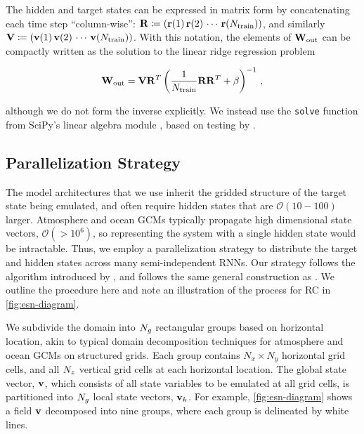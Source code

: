 The hidden and target states can be expressed in matrix form by concatenating
each time step ``column-wise'':
$\mathbf{R} \coloneqq (\mathbf{r}(1) \, \mathbf{r}(2) \, \cdots \, \mathbf{r}(N_\text{train}))$,
and similarly\\
\noindent$\mathbf{V} \coloneqq (\mathbf{v}(1) \, \mathbf{v}(2) \, \cdots \, \mathbf{v}(N_\text{train}))$.
With this notation, the elements of $\mathbf{W}_\text{out}$ can be compactly written as the
solution to the linear ridge regression problem
\begin{linenomath*}\begin{equation}
    \mathbf{W}_\text{out} = \mathbf{V} \mathbf{R}^T \left(\dfrac{1}{N_\text{train}}\mathbf{R}\mathbf{R}^T + \beta\right)^{-1} \, ,
    \label{eq:ridge_regression}
\end{equation}\end{linenomath*}
although we do not form the inverse explicitly.
We instead use the \texttt{solve} function from SciPy's linear algebra module
\citep{scipy_2020}, based on testing by
\citet{platt_systematic_2022}.


\subsection{Parallelization Strategy}
\label{subsec:parallelization}

The model architectures that we use inherit the gridded structure of the target
state being emulated, and often require hidden states that are
$\mathcal{O}(10-100)$ larger.
Atmosphere and ocean GCMs typically propagate high dimensional state vectors,
$\mathcal{O}(>10^6)$,
so representing the system with a single hidden state would be intractable.
Thus, we employ a parallelization strategy to distribute the target and hidden
states across many semi-independent RNNs.
Our strategy follows the algorithm introduced by \citet{pathak_model-free_2018},
and follows the same general construction as \citet{arcomano_machine_2020}.
We outline the procedure here and note an illustration of the process for
RC in \cref{fig:esn-diagram}.

We subdivide the domain into $N_{g}$ rectangular groups based on horizontal location,
akin to typical domain decomposition techniques for atmosphere and ocean
GCMs on structured grids.
Each group contains
$N_x\times N_y$ horizontal grid cells, and all $N_{z}$
vertical grid cells at each horizontal location.
The global state vector, $\mathbf{v}$, which consists of all state variables to be
emulated at all grid cells, is partitioned into $N_{g}$ local state vectors,
$\mathbf{v}_{k}$.
For example, \cref{fig:esn-diagram} shows a field $\mathbf{v}$ decomposed into nine
groups, where each group is delineated by white lines.

